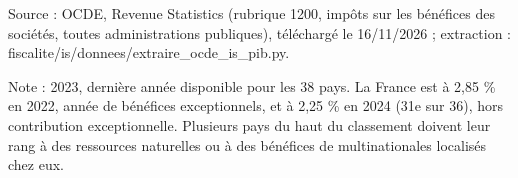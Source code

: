 Source : OCDE, Revenue Statistics (rubrique 1200, impôts sur les bénéfices des sociétés, toutes administrations publiques), téléchargé le 16/11/2026 ; extraction : fiscalite/is/donnees/extraire\_ocde\_is\_pib.py.\par Note : 2023, dernière année disponible pour les 38 pays. La France est à 2,85 \% en 2022, année de bénéfices exceptionnels, et à 2,25 \% en 2024 (31e sur 36), hors contribution exceptionnelle. Plusieurs pays du haut du classement doivent leur rang à des ressources naturelles ou à des bénéfices de multinationales localisés chez eux.
